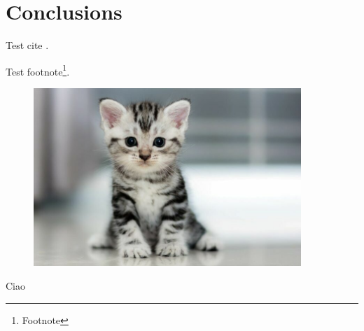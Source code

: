 \chapter{Conclusions}


\lipsum[1-3]

\begin{code}
    \label{code:test}
\end{code}

\lipsum[66]



Test cite \supercite{GOOGLE}.

Test footnote\footnote{Footnote}.

\begin{figure}[H]
    \captionsetup{type=figure}
    \centering
    \includegraphics[width=0.9\textwidth]{./images/example/gattino.png}
    \label{fig:gattino}
\end{figure}

Ciao

\lipsum[66]
